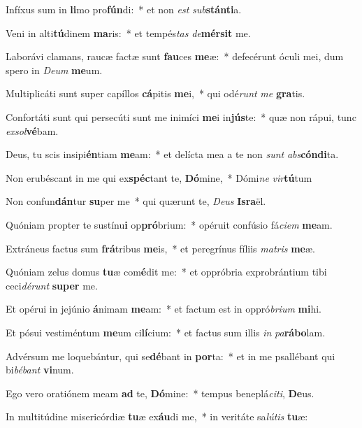 \item Infíxus sum in \textbf{li}mo pro\textbf{fún}di:~* et non \textit{est} \textit{sub}\textbf{stán}\textbf{ti}a.
\item Veni in alti\textbf{tú}dinem \textbf{ma}ris:~* et tempés\textit{tas} \textit{de}\textbf{mér}\textbf{sit} me.
\item Laborávi clamans, raucæ factæ sunt \textbf{fau}ces \textbf{me}æ:~* defecérunt óculi mei, dum spero in \textit{De}\textit{um} \textbf{me}um.
\item Multiplicáti sunt super capíllos \textbf{cá}pitis \textbf{me}i,~* qui odé\textit{runt} \textit{me} \textbf{gra}tis.
\item Confortáti sunt qui persecúti sunt me inimíci \textbf{me}i in\textbf{jús}te:~* quæ non rápui, tunc \textit{ex}\textit{sol}\textbf{vé}bam.
\item Deus, tu scis insipi\textbf{én}tiam \textbf{me}am:~* et delícta mea a te non \textit{sunt} \textit{abs}\textbf{cón}\textbf{di}ta.
\item Non erubéscant in me qui ex\textbf{spéc}tant te, \textbf{Dó}mine,~* Dómi\textit{ne} \textit{vir}\textbf{tú}tum
\item Non confun\textbf{dán}tur \textbf{su}per me~* qui quærunt te, \textit{De}\textit{us} \textbf{Is}\textbf{ra}ël.
\item Quóniam propter te sustínu\textbf{i} op\textbf{pró}brium:~* opéruit confúsio fá\textit{ci}\textit{em} \textbf{me}am.
\item Extráneus factus sum \textbf{frá}tribus \textbf{me}is,~* et peregrínus fíliis \textit{ma}\textit{tris} \textbf{me}æ.
\item Quóniam zelus domus \textbf{tu}æ com\textbf{é}dit me:~* et oppróbria exprobrántium tibi ceci\textit{dé}\textit{runt} \textbf{su}\textbf{per} me.
\item Et opérui in jejúnio \textbf{á}nimam \textbf{me}am:~* et factum est in oppró\textit{bri}\textit{um} \textbf{mi}hi.
\item Et pósui vestiméntum \textbf{me}um ci\textbf{lí}cium:~* et factus sum illis \textit{in} \textit{pa}\textbf{rá}\textbf{bo}lam.
\item Advérsum me loquebántur, qui se\textbf{dé}bant in \textbf{por}ta:~* et in me psallébant qui bi\textit{bé}\textit{bant} \textbf{vi}num.
\item Ego vero oratiónem meam \textbf{ad} te, \textbf{Dó}mine:~* tempus beneplá\textit{ci}\textit{ti}, \textbf{De}us.
\item In multitúdine misericórdiæ \textbf{tu}æ ex\textbf{áu}di me,~* in veritáte sa\textit{lú}\textit{tis} \textbf{tu}æ:
